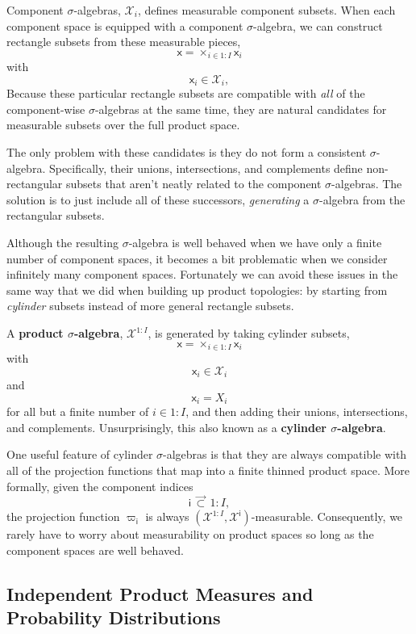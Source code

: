 \documentclass[
  letterpaper,
  DIV=11,
  numbers=noendperiod]{scrartcl}
\begin{document}
Component \(\sigma\)-algebras, \(\mathcal{X}_{i}\), defines measurable
component subsets. When each component space is equipped with a
component \(\sigma\)-algebra, we can construct rectangle subsets from
these measurable pieces, \[
\mathsf{x} = \times_{i \in 1:I} \mathsf{x}_{i}
\] with \[
\mathsf{x}_{i} \in \mathcal{X}_{i},
\] Because these particular rectangle subsets are compatible with
\emph{all} of the component-wise \(\sigma\)-algebras at the same time,
they are natural candidates for measurable subsets over the full product
space.

The only problem with these candidates is they do not form a consistent
\(\sigma\)-algebra. Specifically, their unions, intersections, and
complements define non-rectangular subsets that aren't neatly related to
the component \(\sigma\)-algebras. The solution is to just include all
of these successors, \emph{generating} a \(\sigma\)-algebra from the
rectangular subsets.

Although the resulting \(\sigma\)-algebra is well behaved when we have
only a finite number of component spaces, it becomes a bit problematic
when we consider infinitely many component spaces. Fortunately we can
avoid these issues in the same way that we did when building up product
topologies: by starting from \emph{cylinder} subsets instead of more
general rectangle subsets.

A \textbf{product \(\sigma\)-algebra}, \(\mathcal{X}^{1:I}\), is
generated by taking cylinder subsets, \[
\mathsf{x} = \times_{i \in 1:I} \mathsf{x}_{i}
\] with \[
\mathsf{x}_{i} \in \mathcal{X}_{i}
\] and \[
\mathsf{x}_{i} = X_{i}
\] for all but a finite number of \(i \in 1:I\), and then adding their
unions, intersections, and complements. Unsurprisingly, this also known
as a \textbf{cylinder \(\sigma\)-algebra}.

One useful feature of cylinder \(\sigma\)-algebras is that they are
always compatible with all of the projection functions that map into a
finite thinned product space. More formally, given the component indices
\[
\mathsf{i} \, \vec{\subset} \, 1:I,
\] the projection function \(\varpi_{ \mathsf{i} }\) is always
\(( \mathcal{X}^{1:I}, \mathcal{X}^{ \mathsf{i} } )\)-measurable.
Consequently, we rarely have to worry about measurability on product
spaces so long as the component spaces are well behaved.

\subsection{Independent Product Measures and Probability
Distributions}\label{independent-product-measures-and-probability-distributions}
\end{document}
